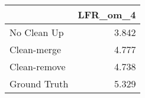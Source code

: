 \begin{tabular}{lr}
\toprule
{} & LFR_om_4 \\
\midrule
No Clean Up  &    3.842 \\
Clean-merge  &    4.777 \\
Clean-remove &    4.738 \\
Ground Truth &    5.329 \\
\bottomrule
\end{tabular}
